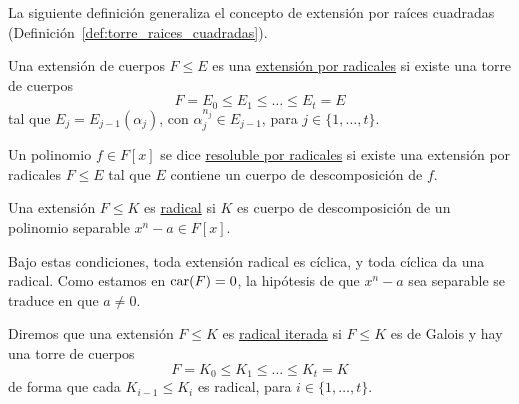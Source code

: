 La siguiente definición generaliza el concepto de extensión por raíces cuadradas (Definición~\ref{def:torre_raices_cuadradas}).
\begin{definicion}
    Una extensión de cuerpos $F\leq E$ es una \underline{extensión por radicales} si existe una torre de cuerpos
    \begin{equation*}
        F = E_0 \leq E_1 \leq \ldots \leq E_t = E
    \end{equation*}
    tal que $E_j=E_{j-1}(\alpha_j)$, con $\alpha_j^{n_j}\in E_{j-1}$, para $j \in \{1,\ldots,t\}$.
\end{definicion}

\begin{definicion}
    Un polinomio $f\in F[x]$ se dice \underline{resoluble por radicales} si existe una extensión por radicales $F\leq E$ tal que $E$ contiene un cuerpo de descomposición de $f$.
\end{definicion}

\begin{definicion}
    Una extensión $F\leq K$ es \underline{radical} si $K$ es cuerpo de descomposición de un polinomio separable $x^n-a\in F[x]$.
\end{definicion}

\noindent
Bajo estas condiciones, toda extensión radical es cíclica, y toda cíclica da una radical. Como estamos en $\operatorname{car}(F) = 0$, la hipótesis de que $x^n-a$ sea separable se traduce en que $a\neq 0$.

\begin{definicion}
    Diremos que una extensión $F\leq K$ es \underline{radical iterada} si $F\leq K$ es de Galois y hay una torre de cuerpos
    \begin{equation*}
        F = K_0 \leq K_1 \leq \ldots \leq K_t = K
    \end{equation*}
    de forma que cada $K_{i-1}\leq K_i$ es radical, para $i \in \{1,\ldots,t\}$.
\end{definicion}

